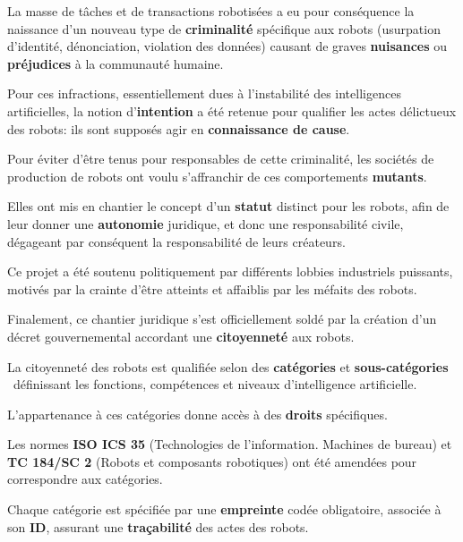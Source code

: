 {La masse de t\^aches et de transactions robotis\'ees a eu pour
cons\'equence la naissance d'un nouveau type de {\bf criminalit\'e}
sp\'ecifique aux robots (usurpation d'identit\'e, d\'enonciation,
violation des donn\'ees) causant de graves {\bf nuisances} ou {\bf pr\'ejudices}
\`a la communaut\'e humaine.

Pour ces infractions, essentiellement dues \`a l'instabilit\'e des
intelligences artificielles, la notion d'{\bf intention} a \'et\'e retenue
pour qualifier les actes d\'elictueux des robots: ils sont suppos\'es
agir en {\bf connaissance de cause}.

Pour \'eviter d'\^etre tenus pour responsables de cette criminalit\'e,
les soci\'et\'es de production de robots ont voulu s'affranchir de ces
comportements {\bf mutants}. 

Elles ont mis en chantier le concept d'un {\bf statut} distinct pour les
robots, afin de leur donner une {\bf autonomie} juridique, et donc une
responsabilit\'e civile, d\'egageant par cons\'equent la
responsabilit\'e de leurs cr\'eateurs.

Ce projet a \'et\'e soutenu politiquement par diff\'erents lobbies
industriels puissants, motiv\'es par la crainte d'\^etre atteints et
affaiblis par les m\'efaits des robots. 

Finalement, ce chantier juridique s'est officiellement sold\'e par la
cr\'eation d'un d\'ecret gouvernemental accordant une {\bf citoyennet\'e} aux
robots.


La citoyennet\'e des robots est qualifi\'ee selon des {\bf cat\'egories} et
{\bf sous{}-cat\'egories} \ d\'efinissant les fonctions, comp\'etences et
niveaux d'intelligence artificielle. 

L'appartenance \`a ces cat\'egories donne acc\`es \`a des {\bf droits}
sp\'ecifiques.


\page


Les normes {\bf ISO ICS 35} (Technologies de l'information. Machines de
bureau) et {\bf TC 184/SC 2} (Robots et composants robotiques) ont \'et\'e
amend\'ees pour correspondre aux cat\'egories.

Chaque cat\'egorie est sp\'ecifi\'ee par une {\bf empreinte} cod\'ee
obligatoire, associ\'ee \`a son {\bf ID}, assurant une {\bf tra\c{c}abilit\'e} des
actes des robots.

}
